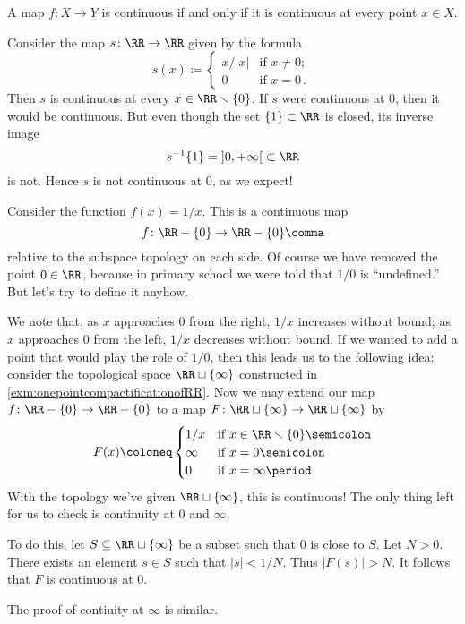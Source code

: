 A map $ f \colon X \to Y $ is continuous if and only if it is continuous at every point $ x \in X $.
\begin{exm}
	Consider the map $ s \colon \RR \to \RR $ given by the formula
	\[
		s(x) \coloneq \begin{cases}
			x/|x| & \text{if } x \neq 0 \semicolon \\
			0 & \text{if } x=0 \period
		\end{cases}
	\]
	Then $s$ is continuous at every $ x \in \RR \smallsetminus \{0\}$.
	If $s$ were continuous at $0$, then it would be continuous.
	But even though the set $\{1\} \subset \RR$ is closed, its inverse image
	\[
		s^{-1}\{1\} = \left]0, +\infty \right[ \subset \RR
	\]
	is not.
	Hence $s$ is not continuous at $0$, as we expect!
\end{exm}

\begin{exm}%
\label{exm:reciprocalextension}
	Consider the function $f(x)=1/x$.
	This is a continuous map
	\begin{equation*}
		f\colon \RR-\{0\} \to \RR-\{0\} \comma
	\end{equation*}
	relative to the subspace topology on each side.
	Of course we have removed the point $0\in\RR$, because in primary school we were told that $1/0$ is \enquote{undefined.}
	But let's try to define it anyhow.

	We note that, as $x$ approaches $0$ from the right, $1/x$ increases without bound;
	as $x$ approaches $0$ from the left, $1/x$ decreases without bound.
	If we wanted to add a point that would play the role of $1/0$, then this leads us to the following idea:
	consider the topological space $\RR\sqcup\{\infty\}$ constructed in \cref{exm:onepointcompactificationofRR}.
	Now we may extend our map $f\colon \RR-\{0\} \to \RR-\{0\}$ to a map $F \colon \RR\sqcup\{\infty\} \to \RR\sqcup\{\infty\}$ by
	\[
		F(x) \coloneq
		\begin{cases}
			1/x & \text{if }x \in \RR \smallsetminus \{0\} \semicolon \\
			\infty   & \text{if }x = 0 \semicolon \\
			0   & \text{if }x = \infty \period
		\end{cases}
	\]
	With the topology we've given $\RR\sqcup\{\infty\}$, this is continuous!
	The only thing left for us to check is continuity at $0$ and $\infty$.
	
	To do this, let $S \subseteq \RR \sqcup \{ \infty \} $ be a subset such that $0$ is close to $S$.
	Let $N >0$.
	There exists an element $s \in S$ such that $|s| < 1/N$.
	Thus $|F(s)|>N$.
	It follows that $F$ is continuous at $0$.
	
	The proof of contiuity at $\infty$ is similar.%
\end{exm}

